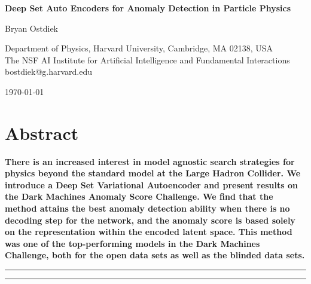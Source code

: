 \documentclass[submission, Phys]{SciPost}
\begin{document}
\begin{center}{\Large \textbf{
Deep Set Auto Encoders for Anomaly Detection in Particle Physics
}}\end{center}


\begin{center}
Bryan Ostdiek
\end{center}

\begin{center}
Department of Physics, Harvard University, Cambridge, MA 02138, USA
\\
The NSF AI Institute for Artificial Intelligence and Fundamental Interactions
\\
bostdiek@g.harvard.edu
\end{center}

\begin{center}
\today
\end{center}


\section*{Abstract}
{\bf
There is an increased interest in model agnostic search strategies for physics beyond the standard model at the Large Hadron Collider.
We introduce a Deep Set Variational Autoencoder and present results on the Dark Machines Anomaly Score Challenge.
We find that the method attains the best anomaly detection ability when there is no decoding step for the network, and the anomaly score is based solely on the representation within the encoded latent space.
This method was one of the top-performing models in the Dark Machines Challenge, both for the open data sets as well as the blinded data sets.
}


\vspace{10pt}
\noindent\rule{\textwidth}{1pt}
\tableofcontents\thispagestyle{fancy}
\noindent\rule{\textwidth}{1pt}
\vspace{10pt}
\end{document}
